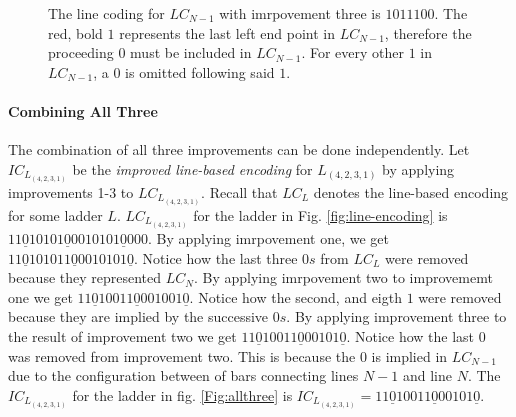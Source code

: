 \begin{figure}[!htp]
    \centering
    \caption{The line coding for $LC_{N-1}$ with imrpovement three is $101110$\underline{$0$}. The red, bold $1$ represents 
    the last left end point in $LC_{N-1}$, therefore the proceeding $0$ must be 
    included in $LC_{N-1}$. For every other $1$ in $LC_{N-1}$, a $0$ is omitted following 
    said $1$.}
    \label{fig:improvement3}
\end{figure}
\paragraph{Combining All Three}
The combination of all three improvements can be done independently. 
Let $IC_{L_{(4,2,3,1)}}$ be the \emph{improved line-based encoding} for $L_{(4,2,3,1)}$ 
by applying improvements 1-3 to $LC_{L_{(4,2,3,1)}}$. Recall that $LC_{L}$ denotes the line-based encoding for some ladder $L$.
$LC_{L_{(4,2,3,1)}}$ for the ladder in Fig. \ref{fig:line-encoding} is $11\underline{0}10101\underline{0}0010101\underline{0}000$.
By applying imrpovement one, we get $11\underline{0}101011\underline{0}0010101\underline{0}$. 
Notice how the last three $0s$ from $LC_{L}$ were removed because they represented $LC_{N}$.
By applying imrpovement two to improvememt one we get $11\underline{0}10011\underline{0}001001\underline{0}$.
Notice how the second, and eigth $1$ were removed because they are implied by 
the successive $0s$. By applying improvement three to the result of improvement 
two we get $11\underline{0}10011\underline{0}00101\underline{0}$. Notice how the last $0$ 
was removed from improvement two. This is because the $0$ is implied in $LC_{N-1}$
due to the configuration between of bars connecting lines $N-1$ and line $N$. The $IC_{L_{(4,2,3,1)}}$ for the ladder in fig. \ref{Fig:allthree} 
is $IC_{L_{(4,2,3,1)}}=11\underline{0}10011\underline{0}00101\underline{0}$.\pagebreak

